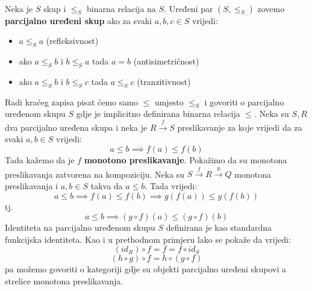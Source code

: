   \begin{example}\ \\
  
   \noindent Neka je $S$ skup i $\leq_S$ binarna relacija na $S$. Uređeni par $(S,
    \leq_S)$ zovemo \textbf{parcijalno uređeni skup} ako za svaki $a, b, c \in S$
    vrijedi:
    \begin{itemize}
      \item $a \leq_S a$ (refleksivnost)
      \item ako $a \leq_S b$ i $b \leq_S a$ tada $a = b$ (antisimetričnost)
      \item ako $a \leq_S b$ i $b \leq_S c$ tada $a \leq_S c$ (tranzitivnost)
    \end{itemize}
    Radi kraćeg zapisa pisat ćemo samo $\leq$ umjesto $\leq_S$ i
  govoriti o parcijalno uređenom skupu $S$ gdje je implicitno definirana
  binarna relacija $\leq$.
  Neka su $S, R$ dva parcijalno uređena skupa i neka je $R \xrightarrow{f} S$
  preslikavanje za koje vrijedi da za svaki $a, b \in S$ vrijedi:
  \begin{equation*}
    a \leq b \implies f(a) \leq f(b)
  \end{equation*}
  Tada kažemo da je $f$ \textbf{monotono preslikavanje}.
  Pokažimo da su monotona preslikavanja zatvorena na kompoziciju.
  Neka su $S \xrightarrow{f} R \xrightarrow{g} Q$ monotona preslikavanja i $a,
  b \in S$ takva da $a \leq b$. Tada vrijedi:
  \begin{equation*}
    a \leq b \implies f(a) \leq f(b) \implies g(f(a)) \leq g(f(b))
  \end{equation*}
  tj.
  \begin{equation*}
    a \leq b \implies (g \circ f)(a) \leq (g \circ f)(b)
  \end{equation*}
  Identiteta na parcijalno uređenom skupu $S$ definirana je kao standardna
  funkcijska identiteta. Kao i u prethodnom primjeru lako se pokaže da vrijedi:
  \begin{equation*}
    (id_R) \circ f = f = f \circ id_S
  \end{equation*}
  \begin{equation*}
    (h \circ g) \circ f = h \circ (g \circ f)
  \end{equation*}
  pa možemo govoriti o kategoriji  gdje su objekti parcijalno
  uređeni skupovi a strelice monotona preslikavanja.\\
  \end{example}

